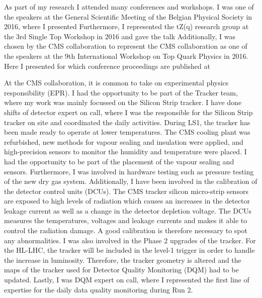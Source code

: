 \newpage\thispagestyle{empty}
As part of my research I attended many conferences and workshops. I was one of the speakers at  the General Scientific Meeting of the Belgian Physical Society in 2016, where I presented
\vspace{+2ex}
\vspace{-2ex}
Furthermore, I represented the tZ(q) research group at the 3rd Single Top Workshop in 2016 and gave the talk
\vspace{+2ex}
\vspace{-2ex}
Additionally, I was chosen by the CMS collaboration to represent the CMS collaboration as one of the speakers at the 9th International Workshop on Top Quark Physics in 2016. Here I presented 
\vspace{+2ex}
\vspace{-2ex}
for which conference proceedings are published at 
\vspace{+2ex}
\vspace{-2ex}


At the CMS collaboration, it is common to take on experimental physics responsibility (EPR). I had the opportunity to be part of the Tracker team, where my work was mainly focussed on the Silicon Strip tracker. I have done shifts of detector expert on call, where I was the responsible for the Silicon Strip tracker on site and coordinated the daily activities. During LS1, the tracker has been made ready to operate at lower temperatures. The CMS cooling plant was refurbished, new methods for vapour sealing and insulation were applied, and high-precision sensors to monitor the humidity and temperature were placed. I had the opportunity to be part of the placement of the vapour sealing and sensors. Furthermore, I was involved in hardware testing such as pressure testing of the new dry gas system. Additionally, I have been involved in the calibration of the detector control units (DCUs). The CMS tracker silicon micro-strip sensors are exposed to high levels of radiation which causes an increases in the detector leakage current as well as a change in the detector depletion voltage. The DCUs measures the temperatures, voltages and leakage currents and makes it able to control the radiation damage. A good calibration is therefore necessary to spot any abnormalities.  I was also involved in the Phase 2 upgrades of the tracker. For the HL-LHC, the tracker will be included in the level-1 trigger in order to handle the increase in luminosity. Therefore, the tracker geometry is altered and the maps of the tracker used for Detector Quality Monitoring (DQM) had to be updated. Lastly, I was DQM expert on call, where I represented the first line of expertise for the daily data quality monitoring during Run 2. 

